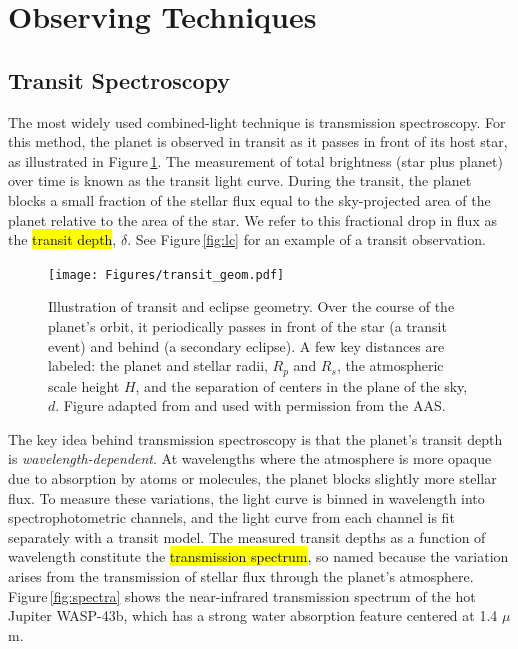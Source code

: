 \documentclass[graybox,natbib,nosecnum]{svmult}
\newcommand{\hbindex}[1]{\hl{#1}\index{#1}}  %
\begin{document}
\section{Observing Techniques} 

\subsection{Transit Spectroscopy}
The most widely used combined-light technique is transmission spectroscopy. For this method, the planet is observed in transit as it passes in front of its host star, as illustrated in Figure\,\ref{fig:geom}.  The measurement of total brightness (star plus planet) over time is known as the transit light curve.  During the transit, the planet blocks a small fraction of the stellar flux equal to the sky-projected area of the planet relative to the area of the star. We refer to this fractional drop in flux as the \hbindex{transit depth}, $\delta$. See Figure\,\ref{fig:lc} for an example of a transit observation.

\begin{figure}
\begin{centering}
\texttt{[image: Figures/transit\_geom.pdf]}
\caption{Illustration of transit and eclipse geometry. Over the course of the planet's orbit, it periodically passes in front of the star (a transit event) and behind (a secondary eclipse). A few key distances are labeled: the planet and stellar radii, $R_p$ and $R_s$, the atmospheric scale height $H$, and the separation of centers in the plane of the sky, $d$. Figure adapted from \citealt{robinson17} and used with permission from the AAS.}
\label{fig:geom}       
\end{centering}
\end{figure}

The key idea behind transmission spectroscopy is that the planet's transit depth is \emph{wavelength-dependent}.  At wavelengths where the atmosphere is more opaque due to absorption by atoms or molecules, the planet blocks slightly more stellar flux.  To measure these variations, the light curve is binned in wavelength into spectrophotometric channels, and the light curve from each channel is fit separately with a transit model.  The measured transit depths as a function of wavelength constitute the \hbindex{transmission spectrum}, so named because the variation arises from the transmission of stellar flux through the planet's atmosphere. Figure\,\ref{fig:spectra} shows the near-infrared transmission spectrum of the hot Jupiter WASP-43b, which has a strong water absorption feature centered at 1.4 $\mu$m. 
 
\end{document}
